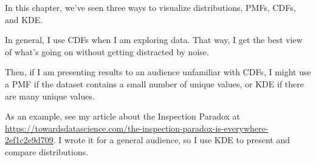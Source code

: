 In this chapter, we've seen three ways to visualize distributions, PMFs,
CDFs, and KDE.

In general, I use CDFs when I am exploring data. That way, I get the
best view of what's going on without getting distracted by noise.

Then, if I am presenting results to an audience unfamiliar with CDFs, I
might use a PMF if the dataset contains a small number of unique values,
or KDE if there are many unique values.

As an example, see my article about the Inspection Paradox at
\url{https://towardsdatascience.com/the-inspection-paradox-is-everywhere-2ef1c2e9d709}.
I wrote it for a general audience, so I use KDE to present and compare
distributions.

